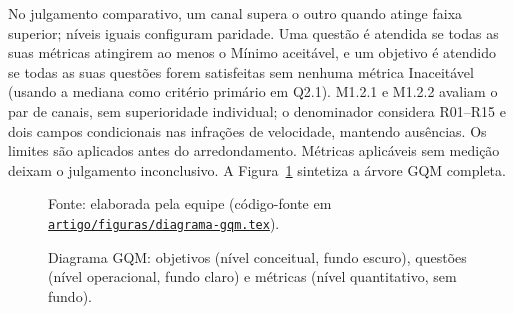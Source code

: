 No julgamento comparativo, um canal supera o outro quando atinge faixa superior; níveis iguais configuram paridade. Uma questão é atendida se todas as suas métricas atingirem ao menos o Mínimo aceitável, e um objetivo é atendido se todas as suas questões forem satisfeitas sem nenhuma métrica Inaceitável (usando a mediana como critério primário em Q2.1). M1.2.1 e M1.2.2 avaliam o par de canais, sem superioridade individual; o denominador considera R01--R15 e dois campos condicionais nas infrações de velocidade, mantendo ausências. Os limites são aplicados antes do arredondamento. Métricas aplicáveis sem medição deixam o julgamento inconclusivo. A Figura~\ref{fig:diagrama-gqm} sintetiza a árvore GQM completa.

\begin{figure}[htbp]
\centering

\caption{Diagrama GQM: objetivos (nível conceitual, fundo escuro), questões (nível operacional, fundo claro) e métricas (nível quantitativo, sem fundo).}
\label{fig:diagrama-gqm}
\par\smallskip
\scriptsize Fonte: elaborada pela equipe (código-fonte em \href{https://github.com/FCTE-Qualidade-de-Software-1/2026-2_T02_KATHERINE_JOHNSON/blob/main/artigo/figuras/diagrama-gqm.tex}{\nolinkurl{artigo/figuras/diagrama-gqm.tex}}).
\end{figure}